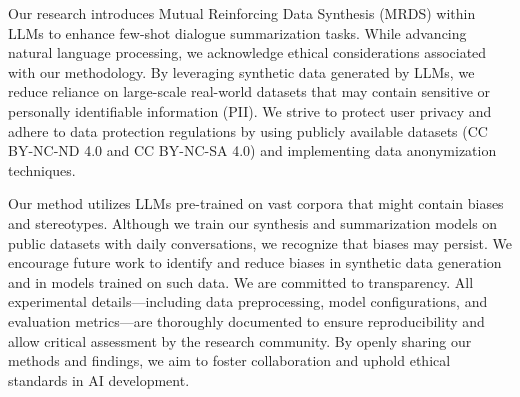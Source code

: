 
Our research introduces Mutual Reinforcing Data Synthesis (MRDS) within LLMs to enhance few-shot dialogue summarization tasks. While advancing natural language processing, we acknowledge ethical considerations associated with our methodology.
By leveraging synthetic data generated by LLMs, we reduce reliance on large-scale real-world datasets that may contain sensitive or personally identifiable information (PII). We strive to protect user privacy and adhere to data protection regulations by using publicly available datasets (CC BY-NC-ND 4.0 and CC BY-NC-SA 4.0) and implementing data anonymization techniques.

Our method utilizes LLMs pre-trained on vast corpora that might contain biases and stereotypes. Although we train our synthesis and summarization models on public datasets with daily conversations, we recognize that biases may persist. We encourage future work to identify and reduce biases in synthetic data generation and in models trained on such data.
We are committed to transparency. All experimental details—including data preprocessing, model configurations, and evaluation metrics—are thoroughly documented to ensure reproducibility and allow critical assessment by the research community. By openly sharing our methods and findings, we aim to foster collaboration and uphold ethical standards in AI development.




